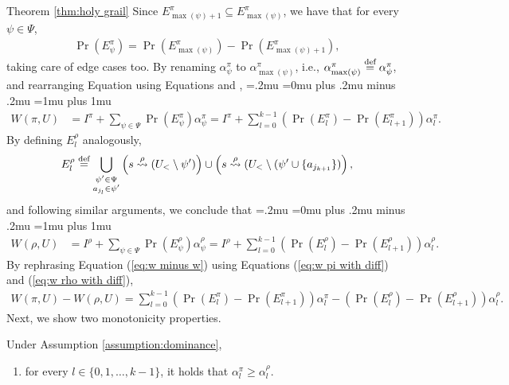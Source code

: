 \begin{proofof}{Theorem \ref{thm:holy grail}}
Since $E^\pi_{\max(\psi)+1}\subseteq E^\pi_{\max(\psi)}$, we have that for every $\psi\in \Psi$,
\begin{align}\label{eq:e pi with Z}
\Pr(E^\pi_\psi)=\Pr(E^\pi_{\max(\psi)})-\Pr(E^\pi_{\max(\psi)+1}),
\end{align}
taking care of edge cases too. By renaming $\alpha^\pi_\psi$ to $\alpha^\pi_{\max(\psi)}$, i.e., $\alpha^\pi_{\max(\psi)} \stackrel{\text{def}}{=} \alpha^\pi_\psi $, and rearranging Equation  using Equations  and ,
{\thinmuskip=.2mu
\medmuskip=0mu plus .2mu minus .2mu
\thickmuskip=1mu plus 1mu
\begin{align}\label{eq:w pi with diff}
W(\pi,U)&= I^\pi+\sum_{\psi\in \Psi} \Pr\left(E^\pi_\psi\right) \alpha^\pi_\psi=I^\pi+\sum_{l=0}^{k-1}\left(\Pr(E^\pi_{l})-\Pr(E^\pi_{l+1})\right) \alpha^\pi_l.
\end{align}}%
By defining $E^\rho_l$ analogously,
\[
E^\rho_{l} \stackrel{\text{def}}{=}  \bigcup_{\substack{\psi' \in \Psi\\a_{j_l} \in \psi' }} \left(s\stackrel{\rho}{\rightsquigarrow}(U_<\setminus \psi')\right)\cup\left(s\stackrel{\rho}{\rightsquigarrow}(U_<\setminus (\psi' \cup \{a_{j_{k+1}}\})\right),
\]
and following similar arguments, we conclude that
{\thinmuskip=.2mu
\medmuskip=0mu plus .2mu minus .2mu
\thickmuskip=1mu plus 1mu
\begin{align}\label{eq:w rho with diff}
W(\rho,U)&= I^\rho+\sum_{\psi\in \Psi} \Pr\left(E^\rho_\psi\right) \alpha^\rho_\psi=I^\rho+\sum_{l=0}^{k-1}\left(\Pr(E^\rho_{l})-\Pr(E^\rho_{l+1})\right) \alpha^\rho_l.
\end{align}}%
By rephrasing Equation (\ref{eq:w minus w}) using Equations (\ref{eq:w pi with diff}) and (\ref{eq:w rho with diff}),
\begin{align}\label{eq: thm step 1 good}
W(\pi,U)-W(\rho,U)=\sum_{l=0}^{k-1}\left(\Pr(E^\pi_{l})-\Pr(E^\pi_{l+1})\right) \alpha^\pi_l-\left(\Pr(E^\rho_{l})-\Pr(E^\rho_{l+1})\right) \alpha^\rho_l.
\end{align}
Next, we show two monotonicity properties.
\begin{proposition}\label{prop: monotonicity in thm}
Under Assumption \ref{assumption:dominance},
\begin{enumerate}
\item for every $l\in \{0,1,\dots,k-1 \}$, it holds that $\alpha^\pi_l \geq \alpha^\rho_l$. \label{item:prop alphas rho pi}

\end{enumerate}
\end{proposition}
\end{proofof}
